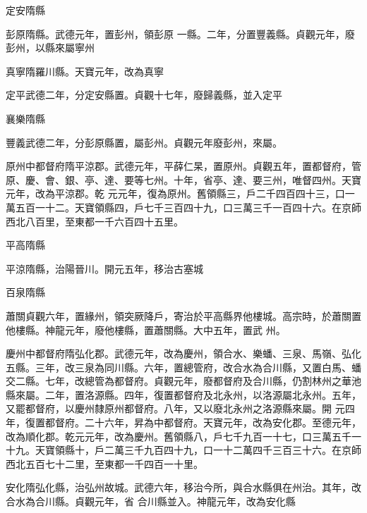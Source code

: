 \begin{pinyinscope}
 定安隋縣



 彭原隋縣。武德元年，置彭州，領彭原
 一縣。二年，分置豐義縣。貞觀元年，廢彭州，以縣來屬寧州



 真寧隋羅川縣。天寶元年，改為真寧



 定平武德二年，分定安縣置。貞觀十七年，廢歸義縣，並入定平



 襄樂隋縣



 豐義武德二年，分彭原縣置，屬彭州。貞觀元年廢彭州，來屬。



 原州中都督府隋平涼郡。武德元年，平薛仁杲，置原州。貞觀五年，置都督府，管原、慶、會、銀、亭、達、要等七州。十年，省亭、達、要三州，唯督四州。天寶元年，改為平涼郡。乾
 元元年，復為原州。舊領縣三，戶二千四百四十三，口一萬五百一十二。天寶領縣四，戶七千三百四十九，口三萬三千一百四十六。在京師西北八百里，至東都一千六百四十五里。



 平高隋縣



 平涼隋縣，治陽晉川。開元五年，移治古塞城



 百泉隋縣



 蕭關貞觀六年，置緣州，領突厥降戶，寄治於平高縣界他樓城。高宗時，於蕭關置他樓縣。神龍元年，廢他樓縣，置蕭關縣。大中五年，置武
 州。



 慶州中都督府隋弘化郡。武德元年，改為慶州，領合水、樂蟠、三泉、馬嶺、弘化五縣。三年，改三泉為同川縣。六年，置總管府，改合水為合川縣，又置白馬、蟠交二縣。七年，改總管為都督府。貞觀元年，廢都督府及合川縣，仍割林州之華池縣來屬。二年，置洛源縣。四年，復置都督府及北永州，以洛源屬北永州。五年，又罷都督府，以慶州隸原州都督府。八年，又以廢北永州之洛源縣來屬。開
 元四年，復置都督府。二十六年，昇為中都督府。天寶元年，改為安化郡。至德元年，改為順化郡。乾元元年，改為慶州。舊領縣八，戶七千九百一十七，口三萬五千一十九。天寶領縣十，戶二萬三千九百四十九，口一十二萬四千三百三十六。在京師西北五百七十二里，至東都一千四百一十里。



 安化隋弘化縣，治弘州故城。武德六年，移治今所，與合水縣俱在州治。其年，改合水為合川縣。貞觀元年，省
 合川縣並入。神龍元年，改為安化縣




\end{pinyinscope}
